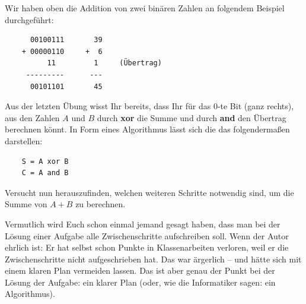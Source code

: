 \begin{exercise}
    Wir haben oben die Addition von zwei binären Zahlen an folgendem Beispiel durchgeführt:
\begin{lstlisting}
      00100111       39
    + 00000110     +  6
          11         1     (Übertrag)
     ---------      ---
      00101101       45
\end{lstlisting}
    Aus der letzten Übung wisst Ihr bereits, dass Ihr für das 0-te Bit (ganz rechts), aus den Zahlen $A$ und $B$ durch \textbf{xor} die Summe und durch \textbf{and} den Übertrag berechnen könnt. In Form eines Algorithmus lässt sich die das folgendermaßen darstellen:
\begin{verbatim}
    S = A xor B
    C = A and B
\end{verbatim}
    Versucht nun herauszufinden, welchen weiteren Schritte notwendig sind, um die Summe von $A+B$ zu berechnen.
    \begin{solution}
      Vermutlich wird Euch schon einmal jemand gesagt haben, dass man bei der Lösung einer Aufgabe alle Zwischenschritte aufschreiben soll. Wenn der Autor ehrlich ist: Er hat selbst schon Punkte in Klassenarbeiten verloren, weil er die Zwischenschritte nicht aufgeschrieben hat. Das war ärgerlich – und hätte sich mit einem klaren Plan vermeiden lassen. Das ist aber genau der Punkt bei der Lösung der Aufgabe: ein klarer Plan (oder, wie die Informatiker sagen: ein Algorithmus).


\end{solution}
\end{exercise}
